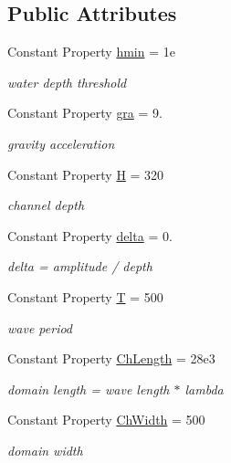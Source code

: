 \subsection*{Public Attributes}
\begin{DoxyCompactItemize}
\item 
Constant Property \hyperlink{class_open_channel2d_ad2dcc13d8c7e091d93205ec67c676064}{hmin} = 1e
\begin{DoxyCompactList}\small\item\em water depth threshold \end{DoxyCompactList}\item 
Constant Property \hyperlink{class_open_channel2d_a700031d06a370545b38c31810c09590c}{gra} = 9.
\begin{DoxyCompactList}\small\item\em gravity acceleration \end{DoxyCompactList}\item 
Constant Property \hyperlink{class_open_channel2d_a1c41bef8b83de402f4a8c03504777f73}{H} = 320
\begin{DoxyCompactList}\small\item\em channel depth \end{DoxyCompactList}\item 
Constant Property \hyperlink{class_open_channel2d_acfffb41190a2dae0106aee6c3d52dee1}{delta} = 0.
\begin{DoxyCompactList}\small\item\em delta = amplitude / depth \end{DoxyCompactList}\item 
Constant Property \hyperlink{class_open_channel2d_af18cc997c4945ad69bcf5136385ddff2}{T} = 500
\begin{DoxyCompactList}\small\item\em wave period \end{DoxyCompactList}\item 
Constant Property \hyperlink{class_open_channel2d_aa91ccfffe90c54158eeb815d41d2bb79}{Ch\+Length} = 28e3
\begin{DoxyCompactList}\small\item\em domain length = wave length $\ast$ lambda \end{DoxyCompactList}\item 
Constant Property \hyperlink{class_open_channel2d_ac64b88f082e0f96c627c3313b05e9fa9}{Ch\+Width} = 500
\begin{DoxyCompactList}\small\item\em domain width \end{DoxyCompactList}\item 

\end{DoxyCompactItemize}
